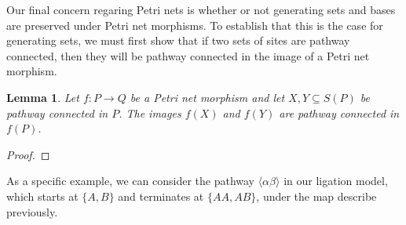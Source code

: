 \documentclass[aps,prd,onecolumn,nofootinbib,letterpaper,preprintnumbers,superscriptaddress,eqsecnum]{revtex4}
\newtheorem{lemma}{Lemma}
\theoremstyle{definition}
\newcommand{\pathway}[1]{\langle#1\rangle}
\newcommand{\red}[1]{{\color{red}#1}}
\newcommand{\TODO}[1]{\noindent\red{\textbf{TODO:}~#1}}
\begin{document}
Our final concern regaring Petri nets is whether or not generating sets and bases are preserved under Petri net morphisms.
To establish that this is the case for generating sets, we must first show that if two sets of sites are pathway connected, then they will be pathway connected in the image of a Petri net morphism.
\begin{lemma}\label{lem:image-of-pathways}
    Let $f: P \rightarrow Q$ be a Petri net morphism and let $X, Y \subseteq S(P)$ be pathway connected in $P$.
    The images $f(X)$ and $f(Y)$ are pathway connected in $f(P)$.
\end{lemma}
\begin{proof}
    \TODO{Complete}
\end{proof}

As a specific example, we can consider the pathway $\pathway{\alpha\beta}$ in our ligation model, which starts at $\{A, B\}$ and terminates at $\{AA, AB\}$, under the map describe previously.
\end{document}
